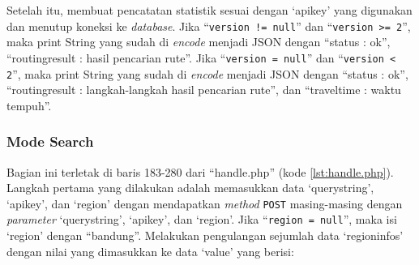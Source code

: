 Setelah itu, membuat pencatatan statistik sesuai dengan `apikey' yang digunakan dan menutup koneksi ke \textit{database}. Jika ``\texttt{version != null}'' dan ``\texttt{version >= 2}'', maka print String yang sudah di \textit{encode} menjadi JSON dengan ``status : ok'', ``routingresult : hasil pencarian rute''. Jika ``\texttt{version = null}'' dan ``\texttt{version < 2}'', maka print String yang sudah di \textit{encode} menjadi JSON dengan ``status : ok'', ``routingresult : langkah-langkah hasil pencarian rute'', dan ``traveltime : waktu tempuh''.

\subsubsection{Mode Search}
Bagian ini terletak di baris 183-280 dari ``handle.php'' (kode \ref{lst:handle.php}). Langkah pertama yang dilakukan adalah memasukkan data `querystring', `apikey', dan `region' dengan mendapatkan \textit{method} \verb!POST! masing-masing dengan \textit{parameter} `querystring', `apikey', dan `region'. Jika ``\texttt{region = null}'', maka isi `region' dengan ``bandung''. Melakukan pengulangan sejumlah data `regioninfos' dengan nilai yang dimasukkan ke data `value' yang berisi:

